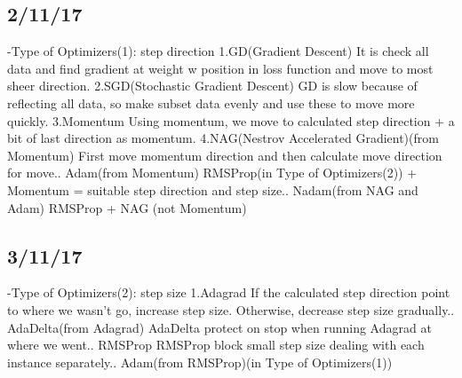 \documentclass{article}
\begin{document}
\begin{CJK}{UTF8}{}
\subsection{2/11/17}
-Type of Optimizers(1): step direction\newline
1.GD(Gradient Descent)\newline
It is check all data and find gradient at weight w position in loss function and move to most sheer direction.\newline
2.SGD(Stochastic Gradient Descent)\newline
GD is slow because of reflecting all data, so make subset data evenly and use these to move more quickly.\newline
3.Momentum\newline
Using momentum, we move to calculated step direction + a bit of last direction as momentum.\newline
4.NAG(Nestrov Accelerated Gradient)(from Momentum)\newline
First move momentum direction and then calculate move direction for move.. Adam(from Momentum)\newline
RMSProp(in Type of Optimizers(2)) + Momentum = suitable step direction and step size.. Nadam(from NAG and Adam)\newline
RMSProp + NAG (not Momentum)\newline

\subsection{3/11/17} 
-Type of Optimizers(2): step size\newline
1.Adagrad\newline
If the calculated step direction point to where we wasn't go, increase step size. Otherwise, decrease step size gradually.. AdaDelta(from Adagrad)\newline
AdaDelta protect on stop when running Adagrad at where we went.. RMSProp\newline
RMSProp block small step size dealing with each instance separately.. Adam(from RMSProp)(in Type of Optimizers(1))\newline



\end{CJK}
\end{document}

